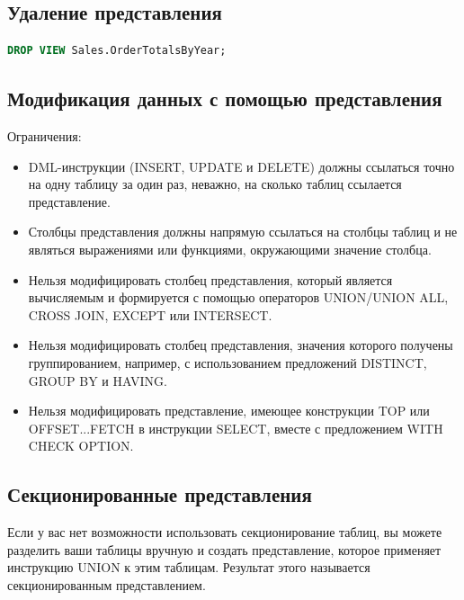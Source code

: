 \subsection{Удаление представления}

\begin{lstlisting}[label=lst:funcReturn, language=sql]
	DROP VIEW Sales.OrderTotalsByYear;
\end{lstlisting}


\subsection{Модификация данных с помощью представления}

Ограничения:

\begin{itemize}
	\item DML-инструкции (INSERT, UPDATE и DELETE) должны ссылаться точно на одну
	таблицу за один раз, неважно, на сколько таблиц ссылается представление. 
	\item Столбцы представления должны напрямую ссылаться на столбцы таблиц и не
	являться выражениями или функциями, окружающими значение столбца. 
	\item Нельзя модифицировать столбец представления, который является вычисляемым и формируется с помощью операторов UNION/UNION ALL, CROSS JOIN, EXCEPT
	или INTERSECT. 
	\item Нельзя модифицировать столбец представления, значения которого получены
	группированием, например, с использованием предложений DISTINCT, GROUP BY и
	HAVING. 
	\item Нельзя модифицировать представление, имеющее конструкции TOP или
	OFFSET...FETCH в инструкции SELECT, вместе с предложением WITH CHECK OPTION. 
\end{itemize}

\subsection{Секционированные представления}

Если у вас нет возможности
использовать секционирование таблиц, вы можете разделить ваши таблицы вручную и создать представление, которое применяет инструкцию UNION к этим
таблицам. Результат этого называется секционированным представлением.

